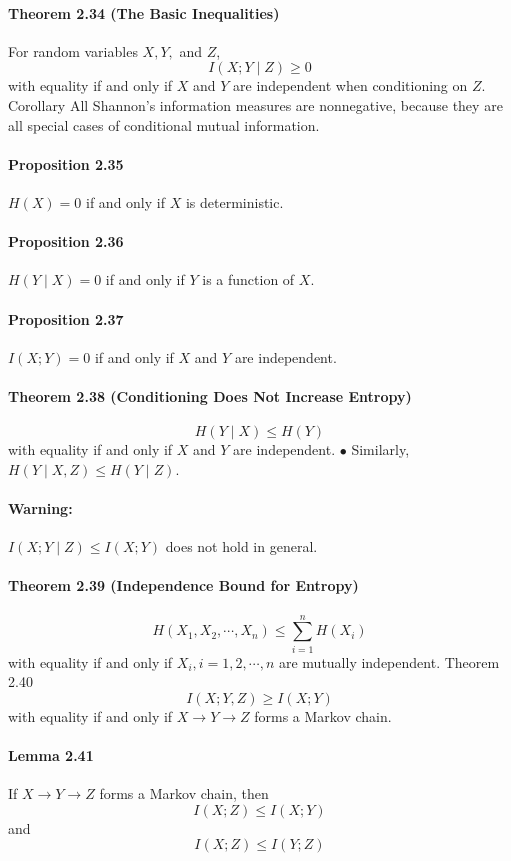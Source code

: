 \documentclass[8pt]{article}
\begin{document}
\paragraph{Theorem 2.34 (The Basic Inequalities)} For random variables $X, Y,$ and $Z$,
$$
I(X ; Y \mid Z) \geq 0
$$
with equality if and only if $X$ and $Y$ are independent when conditioning on $Z$.
Corollary All Shannon's information measures are nonnegative, because they are all special cases of conditional mutual information.

\paragraph{Proposition 2.35} $H(X)=0$ if and only if $X$ is deterministic.
\paragraph{Proposition 2.36} $H(Y \mid X)=0$ if and only if $Y$ is a function of $X$.
\paragraph{Proposition 2.37} $I(X ; Y)=0$ if and only if $X$ and $Y$ are independent.

\paragraph{Theorem 2.38 (Conditioning Does Not Increase Entropy)}
$$
H(Y \mid X) \leq H(Y)
$$
with equality if and only if $X$ and $Y$ are independent.
$\bullet$ Similarly, $H(Y \mid X, Z) \leq H(Y \mid Z)$.
\paragraph{Warning:} $I(X ; Y \mid Z) \leq I(X ; Y)$ does not hold in general.

\paragraph{Theorem 2.39 (Independence Bound for Entropy)}
$$
H\left(X_{1}, X_{2}, \cdots, X_{n}\right) \leq \sum_{i=1}^{n} H\left(X_{i}\right)
$$
with equality if and only if $X_{i}, i=1,2, \cdots, n$ are mutually independent.
Theorem 2.40
$$
I(X ; Y, Z) \geq I(X ; Y)
$$
with equality if and only if $X \rightarrow Y \rightarrow Z$ forms a Markov chain.

\paragraph{Lemma 2.41} If $X \rightarrow Y \rightarrow Z$ forms a Markov chain, then
$$
I(X ; Z) \leq I(X ; Y)
$$
and
$$
I(X ; Z) \leq I(Y ; Z)
$$
\end{document}
